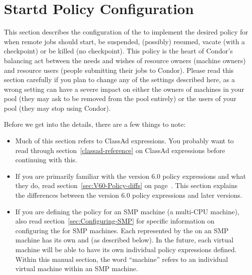 
\section{\label{sec:Configuring-Policy}Startd Policy Configuration}

This section describes the configuration of the  to
implement the desired policy for when remote jobs should start, be
suspended, (possibly) resumed, vacate (with a checkpoint) or be killed
(no checkpoint).
This policy is the heart of Condor's balancing act
between the needs and wishes of resource owners (machine owners) and
resource users (people submitting their jobs to Condor).
Please read
this section carefully if you plan to change any of the settings
described here, as a wrong setting can have a severe impact on
either the owners of machines in your pool (they may
ask to be removed from the pool entirely) or the users of your pool
(they may stop using Condor).

Before we get into the details, there are a few things to note:
\begin{itemize}
\item Much of this section refers to ClassAd expressions.  You
probably want to read through section~\ref{classad-reference} on
ClassAd expressions before continuing with this.

\item If you are primarily familiar with the version 6.0 policy
expressions and what they do, read
section~\ref{sec:V60-Policy-diffs} on
page~\pageref{sec:V60-Policy-diffs}.  This section explains the differences
between the version 6.0 policy expressions and later versions.  

\item If you are defining the policy for an SMP machine
(a multi-CPU machine),
also read section~\ref{sec:Configuring-SMP} for specific information on
configuring the  for SMP machines.  
Each  represented by the  on an
SMP machine has its own  and 
(as described below). 
In the future, each virtual machine will be able to have its
own individual policy expressions defined.
Within this manual section, the word ``machine''
refers to an individual virtual machine within
an SMP machine.
\end{itemize}

